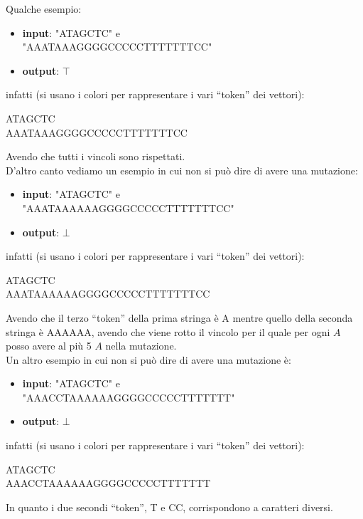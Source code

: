 \documentclass[a4paper,12pt, oneside]{book}
\begin{document}
\begin{esempio}
  Qualche esempio:
  \begin{itemize}
    \item \textbf{input}: "ATAGCTC" e \\"AAATAAAGGGGCCCCCTTTTTTTCC" 
    \item \textbf{output}: $\top$
  \end{itemize}
  infatti (si usano i colori per rappresentare i vari ``token'' dei vettori):
  \begin{center}
    \color{blue}A\color{green}T\color{blue}A\color{red}G\color{yellow}C\color{green}T\color{yellow}C\\ 
    \color{blue}AAA\color{green}T\color{blue}AAA\color{red}GGGG\color{yellow}CCCCC\color{green}TTTTTTT\color{yellow}CC
  \end{center}
  Avendo che tutti i vincoli sono rispettati.
  \\
  D'altro canto vediamo un esempio in cui non si può dire di avere una
  mutazione: 
  \begin{itemize}
    \item \textbf{input}: "ATAGCTC" e \\"AAATAAAAAAGGGGCCCCCTTTTTTTCC" 
    \item \textbf{output}: $\bot$
  \end{itemize}
  infatti (si usano i colori per rappresentare i vari ``token'' dei vettori):
  \begin{center}
    \color{blue}A\color{green}T\color{blue}A\color{red}G\color{yellow}C\color{green}T\color{yellow}C\\ 
    \color{blue}AAA\color{green}T\color{blue}AAAAAA\color{red}GGGG\color{yellow}CCCCC\color{green}TTTTTTT\color{yellow}CC
  \end{center}
  Avendo che il terzo ``token'' della prima stringa è {\color{blue}A} mentre
  quello della seconda stringa è {\color{blue}AAAAAA}, avendo che viene rotto il
  vincolo per il quale per ogni $A$ posso avere al più 5 $A$ nella mutazione.\\
  Un altro esempio in cui non si può dire di avere una
  mutazione è: 
  \begin{itemize}
    \item \textbf{input}: "ATAGCTC" e \\"AAACCTAAAAAAGGGGCCCCCTTTTTTT" 
    \item \textbf{output}: $\bot$
  \end{itemize}
   infatti (si usano i colori per rappresentare i vari ``token'' dei vettori):
  \begin{center}
    \color{blue}A\color{green}T\color{blue}A\color{red}G\color{yellow}C\color{green}T\color{yellow}C\\ 
    \color{blue}AAA\color{yellow}CC\color{green}T\color{blue}AAAAAA\color{red}GGGG\color{yellow}CCCCC\color{green}TTTTTTT
  \end{center}
  In quanto i due secondi ``token'', {\color{green}T} e {\color{yellow}CC},
  corrispondono a caratteri diversi.
\end{esempio}
\end{document}
